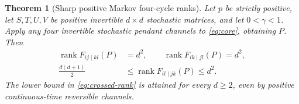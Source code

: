 \documentclass[11pt]{article}
\newtheorem{theorem}{Theorem}[section]
\theoremstyle{definition}
\theoremstyle{remark}
\DeclareMathOperator{\rank}{rank}
\begin{document}
\begin{theorem}[Sharp positive Markov four-cycle ranks]\label{thm:rank}
Let $p$ be strictly positive, let $S,T,U,V$ be positive invertible
$d\times d$ stochastic matrices, and let $0<\gamma<1$. Apply any four
invertible stochastic pendant channels to \eqref{eq:core}, obtaining $P$.
Then
\begin{align}
 \rank F_{ij\mid kl}(P)&=d^2,\qquad
 \rank F_{ik\mid jl}(P)=d^2,\label{eq:adjacent-ranks}\\
 \frac{d(d+1)}2\ &\le\rank F_{il\mid jk}(P)\le d^2.
 \label{eq:crossed-rank}
\end{align}
The lower bound in \eqref{eq:crossed-rank} is attained for every $d\ge2$,
even by positive continuous-time reversible channels.
\end{theorem}
\end{document}
